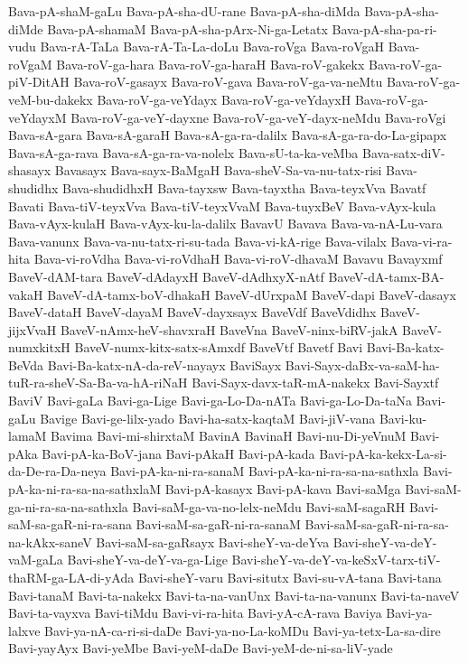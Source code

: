 {Bava-pA-shaM-gaLu
Bava-pA-sha-dU-rane
Bava-pA-sha-diMda
Bava-pA-sha-diMde
Bava-pA-shamaM
Bava-pA-sha-pArx-Ni-ga-Letatx
Bava-pA-sha-pa-ri-vudu
Bava-rA-TaLa
Bava-rA-Ta-La-doLu
Bava-roVga
Bava-roVgaH
Bava-roVgaM
Bava-roV-ga-hara
Bava-roV-ga-haraH
Bava-roV-gakekx
Bava-roV-ga-piV-DitAH
Bava-roV-gasayx
Bava-roV-gava
Bava-roV-ga-va-neMtu
Bava-roV-ga-veM-bu-dakekx
Bava-roV-ga-veYdayx
Bava-roV-ga-veYdayxH
Bava-roV-ga-veYdayxM
Bava-roV-ga-veY-dayxne
Bava-roV-ga-veY-dayx-neMdu
Bava-roVgi
Bava-sA-gara
Bava-sA-garaH
Bava-sA-ga-ra-dalilx
Bava-sA-ga-ra-do-La-gipapx
Bava-sA-ga-rava
Bava-sA-ga-ra-va-nolelx
Bava-sU-ta-ka-veMba
Bava-satx-diV-shasayx
Bavasayx
Bava-sayx-BaMgaH
Bava-sheV-Sa-va-nu-tatx-risi
Bava-shudidhx
Bava-shudidhxH
Bava-tayxsw
Bava-tayxtha
Bava-teyxVva
Bavatf
Bavati
Bava-tiV-teyxVva
Bava-tiV-teyxVvaM
Bava-tuyxBeV
Bava-vAyx-kula
Bava-vAyx-kulaH
Bava-vAyx-ku-la-dalilx
BavavU
Bavava
Bava-va-nA-Lu-vara
Bava-vanunx
Bava-va-nu-tatx-ri-su-tada
Bava-vi-kA-rige
Bava-vilalx
Bava-vi-ra-hita
Bava-vi-roVdha
Bava-vi-roVdhaH
Bava-vi-roV-dhavaM
Bavavu
Bavayxmf
BaveV-dAM-tara
BaveV-dAdayxH
BaveV-dAdhxyX-nAtf
BaveV-dA-tamx-BA-vakaH
BaveV-dA-tamx-boV-dhakaH
BaveV-dUrxpaM
BaveV-dapi
BaveV-dasayx
BaveV-dataH
BaveV-dayaM
BaveV-dayxsayx
BaveVdf
BaveVdidhx
BaveV-jijxVvaH
BaveV-nAmx-heV-shavxraH
BaveVna
BaveV-ninx-biRV-jakA
BaveV-numxkitxH
BaveV-numx-kitx-satx-sAmxdf
BaveVtf
Bavetf
Bavi
Bavi-Ba-katx-BeVda
Bavi-Ba-katx-nA-da-reV-nayayx
BaviSayx
Bavi-Sayx-daBx-va-saM-ha-tuR-ra-sheV-Sa-Ba-va-hA-riNaH
Bavi-Sayx-davx-taR-mA-nakekx
Bavi-Sayxtf
BaviV
Bavi-gaLa
Bavi-ga-Lige
Bavi-ga-Lo-Da-nATa
Bavi-ga-Lo-Da-taNa
Bavi-gaLu
Bavige
Bavi-ge-lilx-yado
Bavi-ha-satx-kaqtaM
Bavi-jiV-vana
Bavi-ku-lamaM
Bavima
Bavi-mi-shirxtaM
BavinA
BavinaH
Bavi-nu-Di-yeVnuM
Bavi-pAka
Bavi-pA-ka-BoV-jana
Bavi-pAkaH
Bavi-pA-kada
Bavi-pA-ka-kekx-La-si-da-De-ra-Da-neya
Bavi-pA-ka-ni-ra-sanaM
Bavi-pA-ka-ni-ra-sa-na-sathxla
Bavi-pA-ka-ni-ra-sa-na-sathxlaM
Bavi-pA-kasayx
Bavi-pA-kava
Bavi-saMga
Bavi-saM-ga-ni-ra-sa-na-sathxla
Bavi-saM-ga-va-no-lelx-neMdu
Bavi-saM-sagaRH
Bavi-saM-sa-gaR-ni-ra-sana
Bavi-saM-sa-gaR-ni-ra-sanaM
Bavi-saM-sa-gaR-ni-ra-sa-na-kAkx-saneV
Bavi-saM-sa-gaRsayx
Bavi-sheY-va-deYva
Bavi-sheY-va-deY-vaM-gaLa
Bavi-sheY-va-deY-va-ga-Lige
Bavi-sheY-va-deY-va-keSxV-tarx-tiV-thaRM-ga-LA-di-yAda
Bavi-sheY-varu
Bavi-situtx
Bavi-su-vA-tana
Bavi-tana
Bavi-tanaM
Bavi-ta-nakekx
Bavi-ta-na-vanUnx
Bavi-ta-na-vanunx
Bavi-ta-naveV
Bavi-ta-vayxva
Bavi-tiMdu
Bavi-vi-ra-hita
Bavi-yA-cA-rava
Baviya
Bavi-ya-lalxve
Bavi-ya-nA-ca-ri-si-daDe
Bavi-ya-no-La-koMDu
Bavi-ya-tetx-La-sa-dire
Bavi-yayAyx
Bavi-yeMbe
Bavi-yeM-daDe
Bavi-yeM-de-ni-sa-liV-yade
}
